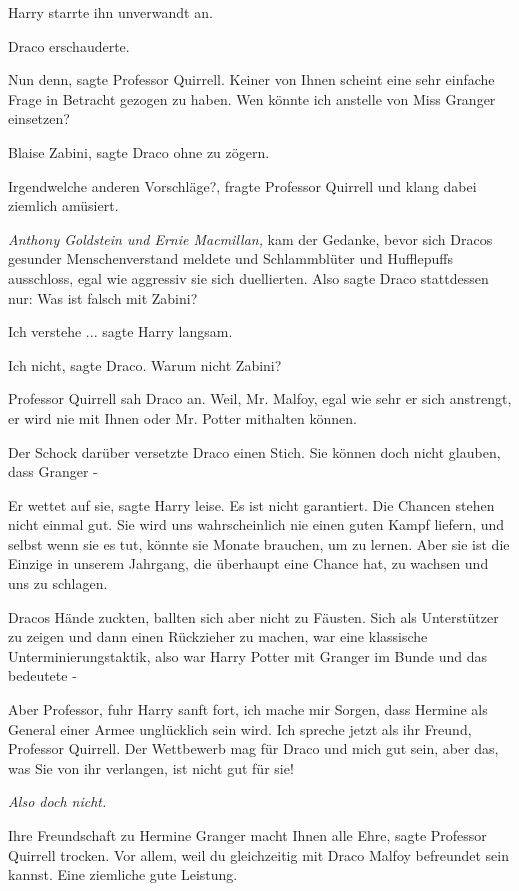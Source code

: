Harry starrte ihn unverwandt an.

Draco erschauderte.

\glqq{}Nun denn\grqq{}, sagte Professor Quirrell. \glqq{} Keiner von Ihnen
scheint eine sehr einfache Frage in Betracht gezogen zu haben. Wen könnte ich
anstelle von Miss Granger einsetzen?\grqq{}

\glqq{}Blaise Zabini\grqq{}, sagte Draco ohne zu zögern.

\glqq{}Irgendwelche anderen Vorschläge?\grqq{}, fragte Professor Quirrell und
klang dabei ziemlich amüsiert.

\emph{Anthony Goldstein und Ernie Macmillan,} kam der Gedanke, bevor sich Dracos
gesunder Menschenverstand meldete und Schlammblüter und Hufflepuffs ausschloss,
egal wie aggressiv sie sich duellierten. Also sagte Draco stattdessen nur:
\glqq{}Was ist falsch mit Zabini?\grqq{}

\glqq{}Ich verstehe ...\grqq{} sagte Harry langsam.

\glqq{}Ich nicht\grqq{}, sagte Draco. \glqq{}Warum nicht Zabini?\grqq{}

Professor Quirrell sah Draco an. \glqq{}Weil, Mr. Malfoy, egal wie sehr er sich
anstrengt, er wird nie mit Ihnen oder Mr. Potter mithalten können.\grqq{}

Der Schock darüber versetzte Draco einen Stich. \glqq{}Sie können doch nicht
glauben, dass Granger -\grqq{}

\glqq{}Er wettet auf sie\grqq{}, sagte Harry leise. \glqq{}Es ist nicht
garantiert. Die Chancen stehen nicht einmal gut. Sie wird uns wahrscheinlich nie
einen guten Kampf liefern, und selbst wenn sie es tut, könnte sie Monate
brauchen, um zu lernen. Aber sie ist die Einzige in unserem Jahrgang, die
überhaupt eine Chance hat, zu wachsen und uns zu schlagen.\grqq{}

Dracos Hände zuckten, ballten sich aber nicht zu Fäusten. Sich als Unterstützer
zu zeigen und dann einen Rückzieher zu machen, war eine klassische
Unterminierungstaktik, also war Harry Potter mit Granger im Bunde und das
bedeutete -

\glqq{}Aber Professor\grqq{}, fuhr Harry sanft fort, \glqq{}ich mache mir
Sorgen, dass Hermine als General einer Armee unglücklich sein wird. Ich spreche
jetzt als ihr Freund, Professor Quirrell. Der Wettbewerb mag für Draco und mich
gut sein, aber das, was Sie von ihr verlangen, ist nicht gut für sie!\grqq{}

\emph{Also doch nicht.}

\glqq{}Ihre Freundschaft zu Hermine Granger macht Ihnen alle Ehre\grqq{}, sagte
Professor Quirrell trocken. \glqq{}Vor allem, weil du gleichzeitig mit Draco
Malfoy befreundet sein kannst. Eine ziemliche gute Leistung.\grqq{}

